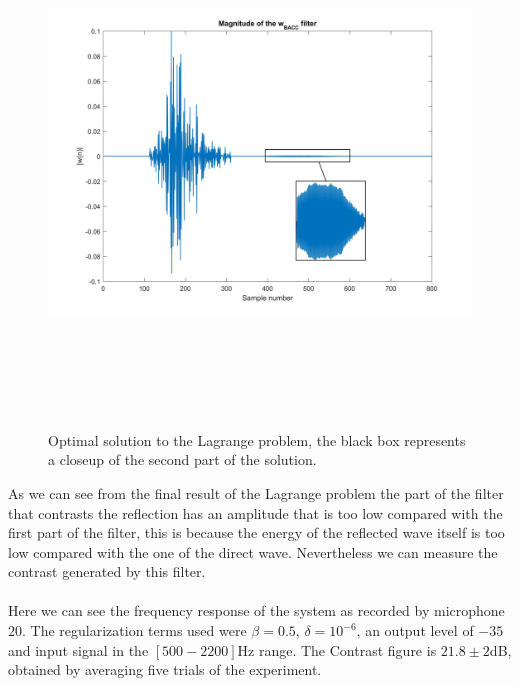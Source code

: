\begin{figure}[H]
\centering
\includegraphics[width=14cm,height=14cm,keepaspectratio]{Figures/filtersplitwithcloseup}
\decoRule
\caption[filter split]{Optimal solution to the Lagrange problem, the black box represents a closeup of the second part of the solution.}
\label{fig:filtersplitwithcloseup}
\end{figure}

As we can see from the final result of the Lagrange problem the part of the filter that contrasts the reflection has an amplitude that is too low compared with the first part of the filter, this is because the energy of the reflected wave itself is too low compared with the one of the direct wave. Nevertheless we can measure the contrast generated by this filter.
\\
\\
Here we can see the frequency response of the system as recorded by microphone $20$. The regularization terms used were $\beta=0.5$, $\delta = 10^{-6}$, an output level of $-35$ and input signal in the $[500-2200]$Hz range. The Contrast figure is $21.8\pm2$dB, obtained by averaging five trials of the experiment.

